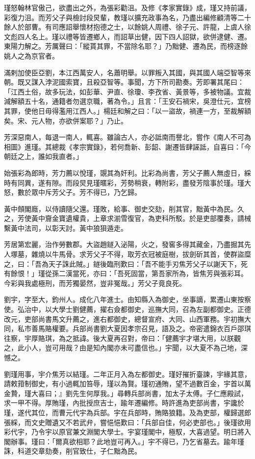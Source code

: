 \begin{pinyinscope}
瑾怒翰林官傲己，欲盡出之外，為張彩勸沮。及修《孝家實錄》成，瑾又持前議，彩復力沮。而芳父子與檢討段炅輩，教瑾以擴充政事為名，乃盡出編修顧清等二十餘人於部曹。有司應詔舉懷材抱德之士，以餘姚人周禮、徐子元、許龍，上虞人徐文彪四人名上。瑾以禮等皆遷鄉人，而詔草出健，因下四人詔獄，欲併逮健、遷。東陽力解之。芳厲聲曰：「縱貰其罪，不當除名耶？」乃黜健、遷為民，而榜逐餘姚人之為京官者。

滿剌加使臣亞劉，本江西萬安人，名蕭明舉。以罪叛入其國，與其國人端亞智等來朝。既又謀入浡泥國索寶，且殺亞智等。事聞，方下所司勘奏。芳即署其尾曰：「江西土俗，故多玩法，如彭華、尹直、徐瓊、李孜省、黃景等，多被物議。宜裁減解額五十名，通籍者勿選京職，著為令。」且言：「王安石禍宋，吳澄仕元，宜榜其罪，使他日毋得濫用江西人。」楊廷和解之曰：「以一盜故，禍連一方，至裁解額矣。宋、元人物，亦欲併案耶？」乃止。

芳深惡南人，每退一南人，輒喜。雖論古人，亦必詆南而譽北，嘗作《南人不可為相圖》進瑾。其總裁《孝宗實錄》，若何喬新、彭韶、謝遷皆肆誣詆，自喜曰：「今朝廷之上，誰如我直者。」

始張彩為郎時，芳力薦以悅瑾，覬其為奸利。比彩為尚書，芳父子薦人無虛日，綵時有同異，遂有隙。而段炅見瑾暱彩，芳勢稍衰，轉附彩，盡發芳陰事於瑾。瑾大怒，數於眾中斥芳父子。芳不得已，乃乞歸。

黃中頠閣廕，以侍讀隨父還。瑾敗，給事、御史交劾，削其官，黜黃中為民。久之，芳使黃中齎金寶遺權貴，上章求湔雪復官，為吏科所駁。於是吏部覆奏，請械繫黃中法司，以彰天討。黃中狼狽遁走。

芳居第宏麗，治作勞數郡。大盜趙鐩入泌陽，火之，發窖多得其藏金，乃盡掘其先人塚墓，雜燒以牛馬骨。求芳父子不得，取芳衣冠被庭樹，拔劍斫其首，使群盜糜之，曰：「吾為天子誅此賊。」鐩後臨刑歎曰：「吾不能手刃焦芳父子以謝天下，死有餘恨！」瑾從孫二漢當死，亦曰：「吾死固當，第吾家所為，皆焦芳與張彩耳。今彩與我處極刑，而芳獨晏然，豈非冤哉。」芳父子竟良死。

劉宇，字至大，鈞州人。成化八年進士。由知縣入為御史，坐事謫，累遷山東按察使。弘治中，以大學士劉健薦，擢右僉都御史，巡撫大同，召為左副都御史。正德改元，吏部尚書馬文升薦之，進右都御史，總督宣府、大同、山西軍務。宇初撫大同，私市善馬賂權要。兵部尚書劉大夏因孝宗召見，語及之。帝密遣錦衣百戶邵琪往察，宇厚賂琪，為之抵諱。後大夏再召對，帝曰：「健薦宇才堪大用，以朕觀之，此小人，豈可用哉？由是知內閣亦未可盡信也。」宇聞，以大夏不為己地，深憾之。

劉瑾用事，宇介焦芳以結瑾。二年正月入為左都御史。瑾好摧折臺諫，宇緣其意，請敕箝制御史，有小過輒加笞辱，瑾以為賢。瑾初通賄，望不過數百金，宇首以萬金贄，瑾大喜曰；』劉先生何厚我。」尋轉兵部尚書，加太子太傅。子仁應殿試，求一甲不得。厚賄瑾，內批授庶吉士，踰年遷編修。時許進為吏部尚書，宇讒於瑾，遂代其位，而曹元代宇為兵部。宇在兵部時，賄賂狼籍。及為吏部，權歸選郎張綵，而文史贈遺又不若武弁，嘗悒悒歎曰：「兵部自佳，何必吏部也。」後瑾欲用彩代宇，乃令宇以原官兼文淵閣大學士。宇宴瑾閣中，極馭，大喜過望。明日將入閣辦事。瑾曰：「爾真欲相耶？此地豈可再入。」宇不得已，乃乞省墓去。踰年瑾誅，科道交章劾奏，削官致仕，子仁黜為民。


\end{pinyinscope}
